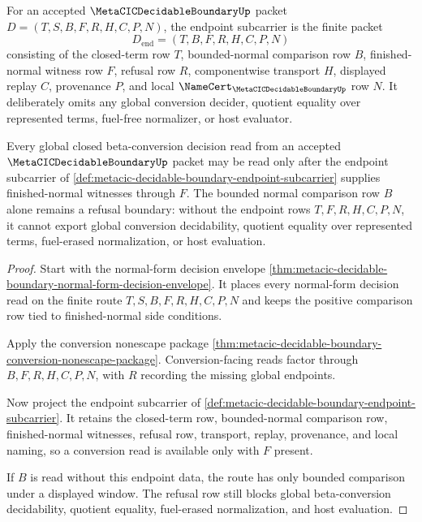 \begin{definition}
\label{def:metacic-decidable-boundary-endpoint-subcarrier}
For an accepted $\MetaCICDecidableBoundaryUp$ packet $D=(T,S,B,F,R,H,C,P,N)$, the endpoint subcarrier is the finite packet
$$
D_{\mathrm{end}}=(T,B,F,R,H,C,P,N)
$$
consisting of the closed-term row $T$, bounded-normal comparison row $B$, finished-normal witness row $F$, refusal row $R$, componentwise transport $H$, displayed replay $C$, provenance $P$, and local $\NameCert_{\MetaCICDecidableBoundaryUp}$ row $N$. It deliberately omits any global conversion decider, quotient equality over represented terms, fuel-free normalizer, or host evaluator.
\end{definition}

\begin{theorem}
\label{thm:metacic-decidable-boundary-finished-normal-endpoint}
Every global closed beta-conversion decision read from an accepted $\MetaCICDecidableBoundaryUp$ packet may be read only after the endpoint subcarrier of \autoref{def:metacic-decidable-boundary-endpoint-subcarrier} supplies finished-normal witnesses through $F$. The bounded normal comparison row $B$ alone remains a refusal boundary: without the endpoint rows $T,F,R,H,C,P,N$, it cannot export global conversion decidability, quotient equality over represented terms, fuel-erased normalization, or host evaluation.
\end{theorem}
\begin{proof}
Start with the normal-form decision envelope \autoref{thm:metacic-decidable-boundary-normal-form-decision-envelope}. It places every normal-form decision read on the finite route $T,S,B,F,R,H,C,P,N$ and keeps the positive comparison row tied to finished-normal side conditions.

Apply the conversion nonescape package \autoref{thm:metacic-decidable-boundary-conversion-nonescape-package}. Conversion-facing reads factor through $B,F,R,H,C,P,N$, with $R$ recording the missing global endpoints.

Now project the endpoint subcarrier of \autoref{def:metacic-decidable-boundary-endpoint-subcarrier}. It retains the closed-term row, bounded-normal comparison row, finished-normal witnesses, refusal row, transport, replay, provenance, and local naming, so a conversion read is available only with $F$ present.

If $B$ is read without this endpoint data, the route has only bounded comparison under a displayed window. The refusal row still blocks global beta-conversion decidability, quotient equality, fuel-erased normalization, and host evaluation.
\end{proof}


